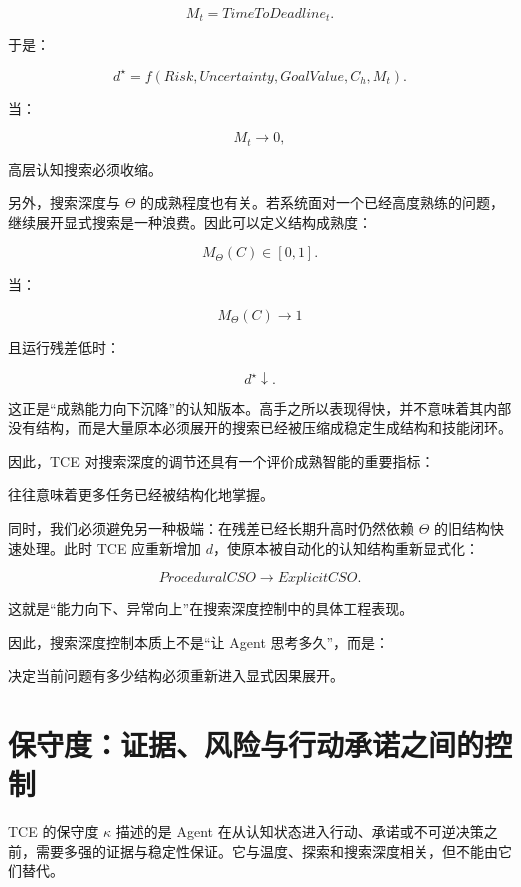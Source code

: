 \[
M_t
=
TimeToDeadline_t.
\]

于是：

\[
d^\star
=
f(
Risk,
Uncertainty,
GoalValue,
C_h,
M_t
).
\]

当：

\[
M_t\rightarrow0,
\]

高层认知搜索必须收缩。

另外，搜索深度与 $\Theta$ 的成熟程度也有关。若系统面对一个已经高度熟练的问题，继续展开显式搜索是一种浪费。因此可以定义结构成熟度：

\[
M_\Theta(C)\in[0,1].
\]

当：

\[
M_\Theta(C)\rightarrow1
\]

且运行残差低时：

\[
d^\star\downarrow.
\]

这正是“成熟能力向下沉降”的认知版本。高手之所以表现得快，并不意味着其内部没有结构，而是大量原本必须展开的搜索已经被压缩成稳定生成结构和技能闭环。

因此，TCE 对搜索深度的调节还具有一个评价成熟智能的重要指标：

\begin{statementbox}
\centering
{}
\end{statementbox}

往往意味着更多任务已经被结构化地掌握。

同时，我们必须避免另一种极端：在残差已经长期升高时仍然依赖 $\Theta$ 的旧结构快速处理。此时 TCE 应重新增加 $d$，使原本被自动化的认知结构重新显式化：

\[
ProceduralCSO
\rightarrow
ExplicitCSO.
\]

这就是“能力向下、异常向上”在搜索深度控制中的具体工程表现。

因此，搜索深度控制本质上不是“让 Agent 思考多久”，而是：

\begin{statementbox}
决定当前问题有多少结构必须重新进入显式因果展开。
\end{statementbox}

\section{保守度：证据、风险与行动承诺之间的控制}

TCE 的保守度 $\kappa$ 描述的是 Agent 在从认知状态进入行动、承诺或不可逆决策之前，需要多强的证据与稳定性保证。它与温度、探索和搜索深度相关，但不能由它们替代。

